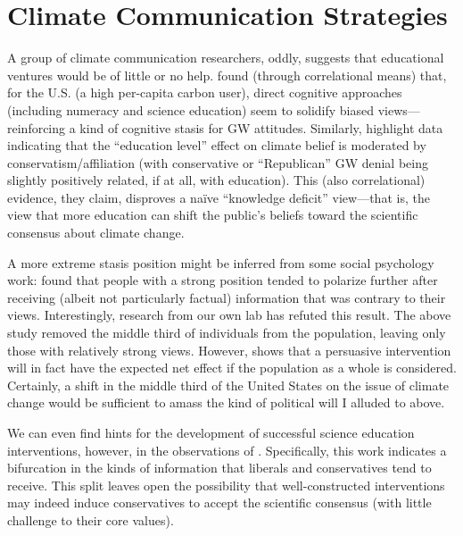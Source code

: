 \section{Climate Communication Strategies}

A group of climate communication researchers, oddly, suggests that educational
ventures would be of little or no help. \textcite{kahan_polarizing_2012} found
(through correlational means) that, for the U.S. (a high per-capita carbon
user), direct cognitive approaches (including numeracy and science education)
seem to solidify biased views---reinforcing a kind of cognitive stasis for GW
attitudes.  Similarly, \textcite{mccright_politicization_2011} highlight data
indicating that the ``education level'' effect on climate belief is moderated by
conservatism/affiliation (with conservative or ``Republican'' GW denial being
slightly positively related, if at all, with education). This (also
correlational) evidence, they claim, disproves a naïve ``knowledge deficit''
view---that is, the view that more education can shift the public's beliefs
toward the scientific consensus about climate change. 

A more extreme stasis position might be inferred from some social psychology
work: \textcite{lord_biased_1979} found that people with a strong position
tended to polarize further after receiving (albeit not particularly factual)
information that was contrary to their views.
Interestingly, research from our own lab has refuted this result. The above
study removed the middle third of individuals from the population, leaving only
those with relatively strong views. However, \textcite{nelson_criminal_2007}
shows that a persuasive intervention will in fact have the expected net effect
if the population as a whole is considered. Certainly, a shift in the middle
third of the United States on the issue of climate change would be sufficient to
amass the kind of political will I alluded to above.

We can even find hints for the development of successful science education
interventions, however, in the observations of
\textcite{mccright_politicization_2011}.  Specifically, this work indicates a
bifurcation in the kinds of information that liberals and conservatives tend to
receive.  This split leaves open the possibility that well-constructed
interventions may indeed induce conservatives to accept the scientific consensus
(with little challenge to their core values).  

